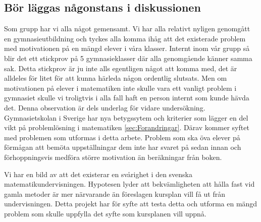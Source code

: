\subsection{Bör läggas någonstans i diskussionen}

\textcolor{WildStrawberry}{
    Som grupp har vi alla något gemensamt. Vi har alla relativt nyligen genomgått en gymnasieutbildning och tyckes alla komma ihåg att det existerade problem med motivationen på en mängd elever i våra klasser. Internt inom vår grupp så blir det ett stickprov på 5 gymnasieklasser där alla genomgående känner samma sak. Detta stickprov är ju inte alls egentligen något att komma med, det är alldeles för litet för att kunna härleda någon ordentlig slutsats. Men om motivationen på elever i matematiken inte skulle vara ett vanligt problem i gymnasiet skulle vi troligtvis i alla fall haft en person internt som kunde hävda det. Denna observation är dels underlag för vidare undersökning. Gymnasietskolan i Sverige har nya betygssytem och kriterier som lägger en del vikt på problemlösning i matematiken \ref{sec:Forandringar}. Därav kommer syftet med problemen som utformas i detta arbete. Problem som ska öva elever på förmågan att bemöta uppställningar dem inte har svaret på sedan innan och förhoppningsvis medföra större motivation än beräkningar från boken.
}

\textcolor{WildStrawberry}{
    Vi har en bild av att det existerar en svårighet i den svenska matematikundervisningen. Hypotesen lyder att bekvämligheten att hålla fast vid gamla metoder är mer närvarande än föreslagen kursplan vill få ut från undervisningen. Detta projekt har för syfte att testa detta och utforma en mängd problem som skulle uppfylla det syfte som kursplanen vill uppnå. }